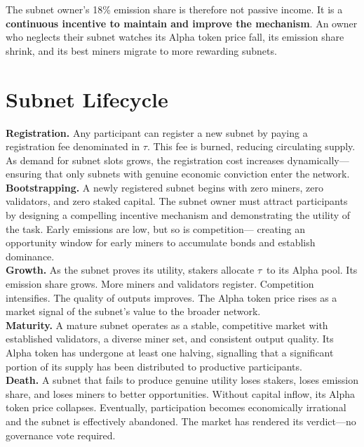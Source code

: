 \documentclass[12pt, a4paper, oneside]{report}
\newcommand{\TAO}{$\tau$}            %
\theoremstyle{definition}
\begin{document}
The subnet owner's 18\% emission share is therefore not passive income. It is 
a \textbf{continuous incentive to maintain and improve the mechanism}. An owner 
who neglects their subnet watches its Alpha token price fall, its emission share 
shrink, and its best miners migrate to more rewarding subnets.

\section{Subnet Lifecycle}

\textbf{Registration.} Any participant can register a new subnet by paying a 
registration fee denominated in \TAO. This fee is burned, reducing circulating 
supply. As demand for subnet slots grows, the registration cost increases 
dynamically—ensuring that only subnets with genuine economic conviction enter 
the network.\\[0.4cm]

\textbf{Bootstrapping.} A newly registered subnet begins with zero miners, 
zero validators, and zero staked capital. The subnet owner must attract 
participants by designing a compelling incentive mechanism and demonstrating 
the utility of the task. Early emissions are low, but so is competition—
creating an opportunity window for early miners to accumulate bonds and 
establish dominance.\\[0.4cm]

\textbf{Growth.} As the subnet proves its utility, stakers allocate \TAO\ 
to its Alpha pool. Its emission share grows. More miners and validators 
register. Competition intensifies. The quality of outputs improves. The 
Alpha token price rises as a market signal of the subnet's value to the 
broader network.\\[0.4cm]

\textbf{Maturity.} A mature subnet operates as a stable, competitive market 
with established validators, a diverse miner set, and consistent output 
quality. Its Alpha token has undergone at least one halving, signalling that 
a significant portion of its supply has been distributed to productive 
participants.\\[0.4cm]

\textbf{Death.} A subnet that fails to produce genuine utility loses stakers, 
loses emission share, and loses miners to better opportunities. Without 
capital inflow, its Alpha token price collapses. Eventually, participation 
becomes economically irrational and the subnet is effectively abandoned. 
The market has rendered its verdict—no governance vote required.
\end{document}
